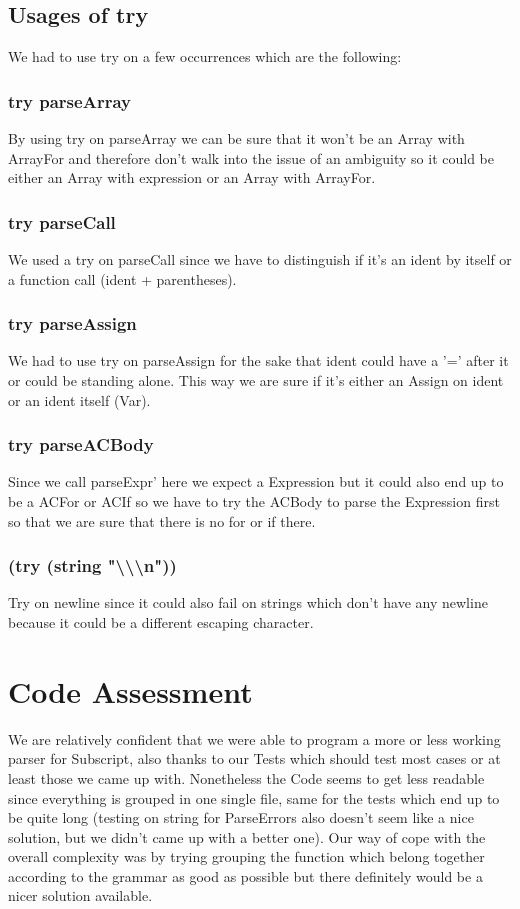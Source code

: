 \documentclass[12pt,a4paper]{article}
\begin{document}
\subsection{Usages of try}
We had to use try on a few occurrences which are the following:
\subsubsection{try parseArray}
By using try on parseArray we can be sure that it won't be an Array with ArrayFor and therefore don't walk into the issue of an ambiguity so it could be either an Array with expression or an Array with ArrayFor.
\subsubsection{try parseCall}
We used a try on parseCall since we have to distinguish if it's an ident by itself or a function call (ident + parentheses).

\subsubsection{try parseAssign}
We had to use try on parseAssign for the sake that ident could have a '=' after it or could be standing alone.
This way we are sure if it's either an Assign on ident or an ident itself (Var).

\subsubsection{try parseACBody}
Since we call parseExpr' here we expect a Expression but it could also end up to be a ACFor or ACIf so we have to try the ACBody to parse the Expression first so that we are sure that there is no for or if there.

\subsubsection{(try (string "\textbackslash\textbackslash\textbackslash{n}"))}
Try on newline since it could also fail on strings which don't have any newline because it could be a different escaping character.

\section{Code Assessment}

We are relatively confident that we were able to program a more or less working parser for Subscript, also thanks to our Tests which should test most cases or at least those we came up with.
Nonetheless the Code seems to get less readable since everything is grouped in one single file, same for the tests which end up to be quite long (testing on string for ParseErrors also doesn't seem like a nice solution, but we didn't came up with a better one).
Our way of cope with the overall complexity was by trying grouping the function which belong together according to the grammar as good as possible but there definitely would be a nicer solution available.
\end{document}
